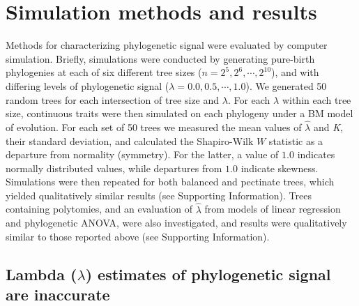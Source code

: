 \documentclass[
]{article}
\begin{document}
\hypertarget{simulation-methods-and-results}{%
\section{Simulation methods and
results}\label{simulation-methods-and-results}}

Methods for characterizing phylogenetic signal were evaluated by
computer simulation. Briefly, simulations were conducted by generating
pure-birth phylogenies at each of six different tree sizes
(\(n=2^5, 2^6, \cdots, 2^{10}\)), and with differing levels of
phylogenetic signal (\(\lambda=0.0, 0.5, \cdots, 1.0\)). We generated 50
random trees for each intersection of tree size and \(\lambda\). For
each \(\lambda\) within each tree size, continuous traits were then
simulated on each phylogeny under a BM model of evolution. For each set
of 50 trees we measured the mean values of \(\hat{\lambda}\) and
\emph{K}, their standard deviation, and calculated the Shapiro-Wilk
\(W\) statistic as a departure from normality (symmetry). For the
latter, a value of \(1.0\) indicates normally distributed values, while
departures from \(1.0\) indicate skewness. Simulations were then
repeated for both balanced and pectinate trees, which yielded
qualitatively similar results (see Supporting Information). Trees
containing polytomies, and an evaluation of \(\hat{\lambda}\) from
models of linear regression and phylogenetic ANOVA, were also
investigated, and results were qualitatively similar to those reported
above (see Supporting Information). \hfill\break

\hypertarget{lambda-lambda-estimates-of-phylogenetic-signal-are-inaccurate}{%
\subsection{\texorpdfstring{Lambda (\(\lambda\)) estimates of
phylogenetic signal are
inaccurate}{Lambda (\textbackslash lambda) estimates of phylogenetic signal are inaccurate}}\label{lambda-lambda-estimates-of-phylogenetic-signal-are-inaccurate}}
\end{document}
